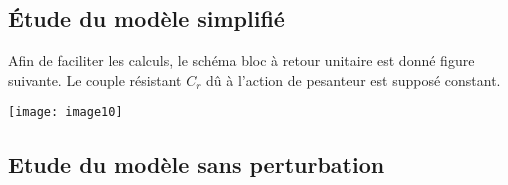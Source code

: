 %
%
%
%
%

\subsection*{Étude du modèle simplifié}
\ifprof
\else
Afin de faciliter les calculs, le schéma bloc à retour unitaire est donné figure suivante. Le couple résistant $C_r$ dû à l'action de pesanteur est supposé constant.

\begin{center}
\texttt{[image: image10]}
\end{center} 



\fi

\subsection*{Etude du modèle sans perturbation}

